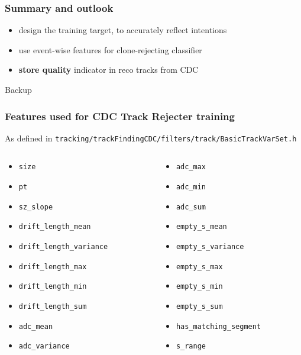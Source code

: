 \documentclass[18pt, aspectratio=169]{beamer}
\newcommand{\greenbold}[1]{\textcolor{kit-green100}{\bf{#1}}}
\begin{document}
\begin{frame}
  \frametitle{Summary and outlook}
  \begin{itemize}
  \item design the training target, to accurately reflect intentions
  \item use event-wise features for clone-rejecting classifier
  \item \greenbold{store quality} indicator in reco tracks from CDC
  \end{itemize}
\end{frame}

\appendix
\backupbegin
\begin{frame}
  \centering \huge
  Backup
\end{frame}

\begin{frame}
  \frametitle{Features  used for CDC Track Rejecter training}
  As defined in \texttt{tracking/trackFindingCDC/filters/track/BasicTrackVarSet.h}
  \begin{columns}
    \begin{column}{0.5\textwidth}
      \begin{itemize}
      \item \lstinline{size}
      \item \lstinline{pt}
      \item \lstinline{sz_slope}
      \item \lstinline{drift_length_mean}
      \item \lstinline{drift_length_variance}
      \item \lstinline{drift_length_max}
      \item \lstinline{drift_length_min}
      \item \lstinline{drift_length_sum}
      \item \lstinline{adc_mean}
      \item \lstinline{adc_variance}
      \end{itemize}
    \end{column}
    \begin{column}{0.5\textwidth}
      \begin{itemize}

      \item \lstinline{adc_max}
      \item \lstinline{adc_min}
      \item \lstinline{adc_sum}
      \item \lstinline{empty_s_mean}
      \item \lstinline{empty_s_variance}
      \item \lstinline{empty_s_max}
      \item \lstinline{empty_s_min}
      \item \lstinline{empty_s_sum}
      \item \lstinline{has_matching_segment}
      \item \lstinline{s_range}
      \end{itemize}      
    \end{column}
  \end{columns}
\end{frame}
\end{document}
